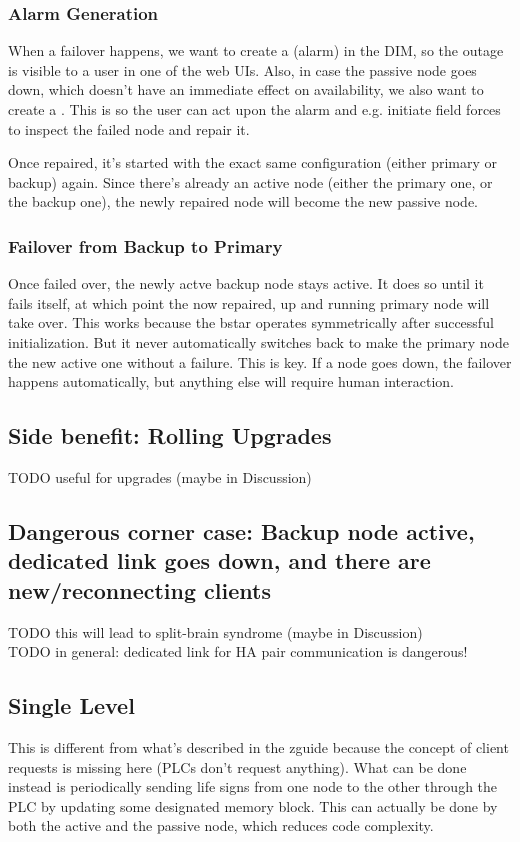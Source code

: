 \subsubsection{Alarm Generation}
When a failover happens, we want to create a  (alarm) in the DIM, so
the outage is visible to a user in one of the web UIs. Also, in case the
passive node goes down, which doesn't have an immediate effect on availability,
we also want to create a . This is so the user can act upon the alarm
and e.g. initiate field forces to inspect the failed node and repair it.

Once repaired, it's started with the exact same configuration (either primary
or backup) again. Since there's already an active node (either the primary one,
or the backup one), the newly repaired node will become the new passive node.

\subsubsection{Failover from Backup to Primary}
Once failed over, the newly actve backup node stays active. It does so until it
fails itself, at which point the now repaired, up and running primary node will
take over. This works because the \gls{bstar} operates symmetrically
after successful initialization. But it never automatically switches back to
make the primary node the new active one without a failure. This is key. If a
node goes down, the failover happens automatically, but anything else will
require human interaction.

\subsection{Side benefit: Rolling Upgrades}
TODO useful for upgrades (maybe in Discussion)\\

\subsection{Dangerous corner case: Backup node active, dedicated link goes down, and there are new/reconnecting clients}
TODO this will lead to split-brain syndrome (maybe in Discussion)\\
TODO in general: dedicated link for HA pair communication is dangerous!\\

\subsection{Single Level}
This is different from what's described in the zguide because the concept of
client requests is missing here (PLCs don't request anything).  What can be
done instead is periodically sending life signs from one node to the other
through the PLC by updating some designated memory block. This can actually be
done by both the active and the passive node, which reduces code complexity.

